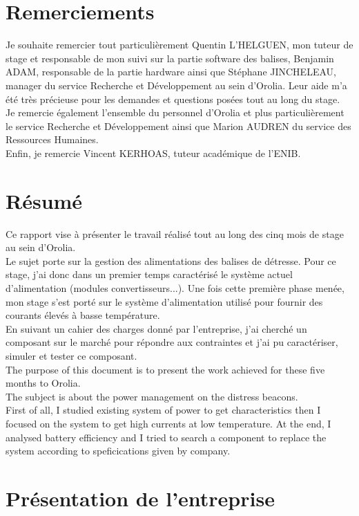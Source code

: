\chapter{Remerciements}



Je souhaite remercier tout particulièrement Quentin L'HELGUEN, mon tuteur de stage et responsable de mon suivi sur la partie software des balises, Benjamin ADAM, responsable de la partie hardware ainsi que Stéphane JINCHELEAU, manager du service Recherche et Développement au sein d'Orolia. Leur aide m'a été très précieuse pour les demandes et questions posées tout au long du stage.\\

Je remercie également l'ensemble du personnel d'Orolia et plus particulièrement le service Recherche et Développement ainsi que Marion AUDREN du service des Ressources Humaines.\\

Enfin, je remercie Vincent KERHOAS, tuteur académique de l'ENIB.\chapter{Résumé}

      Ce rapport vise à présenter le travail réalisé tout au long des cinq mois de stage au sein d'Orolia.\\ Le sujet porte sur la gestion des alimentations des balises de détresse. Pour ce stage, j'ai donc dans un premier temps caractérisé le système actuel d'alimentation (modules convertisseurs...). Une fois cette première phase menée, mon stage s'est porté sur le système d'alimentation utilisé pour fournir des courants élevés à basse température.\\  
      En suivant un cahier des charges donné par l'entreprise, j'ai cherché un composant sur le marché pour répondre aux contraintes et j'ai pu caractériser, simuler et tester ce composant.\\
      
       
    
    The purpose of this document is to present the work achieved for these five months to Orolia.\\
    The subject is about the power management on the distress beacons.\\ First of all, I studied existing system of power to get characteristics then I focused on the system to get high currents at low temperature. At the end, I analysed battery efficiency and I tried to search a component to replace the system according to speficications given by company.\chapter{Présentation de l'entreprise}

